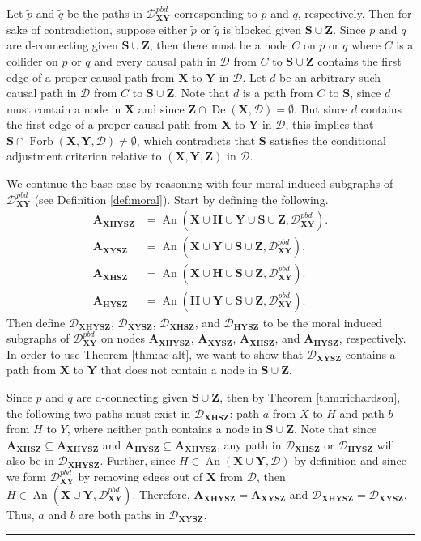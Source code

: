 \documentclass[twoside]{article}
\DeclareMathOperator{\An}{An}
\DeclareMathOperator{\De}{De}
\DeclareMathOperator{\Forb}{Forb}
\newcommand{\fb}[2][X,Y]{\Forb(\mb{#1},#2)}
\newcommand{\gpbd}[2][G]{\mathcal{#1}_{\mb{#2}}^{pbd}}
\newcommand{\mb}[1]{\mathbf{#1}}
\newcommand{\g}[1][G]{\mathcal{#1}}
\newenvironment{proofof}[1][]{\begin{trivlist}
\item[\hskip \labelsep {\bfseries Proof of #1.}]}{\hfill\BlackBox\end{trivlist}}
\newcommand{\BlackBox}{\rule{1.5ex}{1.5ex}}
\begin{document}
\begin{proofof}[Lemma \ref{lem:sound-setup1}]
    Let $\tilde{p}$ and $\tilde{q}$ be the paths in $\gpbd[D]{XY}$ corresponding to $p$ and $q$, respectively. Then for sake of contradiction, suppose either $\tilde{p}$ or $\tilde{q}$ is blocked given $\mb{S} \cup \mb{Z}$. Since $p$ and $q$ are d-connecting given $\mb{S} \cup \mb{Z}$, then there must be a node $C$ on $p$ or $q$ where $C$ is a collider on $p$ or $q$ and every causal path in $\g[D]$ from $C$ to $\mb{S} \cup \mb{Z}$ contains the first edge of a proper causal path from $\mb{X}$ to $\mb{Y}$ in $\g[D]$. Let $d$ be an arbitrary such causal path in $\g[D]$ from $C$ to $\mb{S} \cup \mb{Z}$. Note that $d$ is a path from $C$ to $\mb{S}$, since $d$ must contain a node in $\mb{X}$ and since $\mb{Z} \cap \De(\mb{X},\g[D]) = \emptyset$. But since $d$ contains the first edge of a proper causal path from $\mb{X}$ to $\mb{Y}$ in $\g[D]$, this implies that $\mb{S} \cap \fb{\g[D]} \neq \emptyset$, which contradicts that $\mb{S}$ satisfies the conditional adjustment criterion relative to $(\mb{X,Y,Z})$ in $\g[D]$.

    We continue the base case by reasoning with four moral induced subgraphs of $\gpbd[D]{XY}$ (see Definition \ref{def:moral}). Start by defining the following. 
    \begin{align}
        \mb{A}_{\mb{XHYSZ}} &= \An(\mb{X} \cup \mb{H} \cup \mb{Y} \cup \mb{S} \cup \mb{Z},\gpbd[D]{XY}). \nonumber \\
        \mb{A}_{\mb{XYSZ}} &= \An(\mb{X} \cup \mb{Y} \cup \mb{S} \cup \mb{Z},\gpbd[D]{XY}). \nonumber \\
        \mb{A}_{\mb{XHSZ}} &= \An(\mb{X} \cup \mb{H} \cup \mb{S} \cup \mb{Z},\gpbd[D]{XY}). \nonumber \\
        \mb{A}_{\mb{HYSZ}} &= \An(\mb{H} \cup \mb{Y} \cup \mb{S} \cup \mb{Z},\gpbd[D]{XY}). \nonumber 
    \end{align} 
    Then define $\g[D]_{\mb{XHYSZ}}$, $\g[D]_{\mb{XYSZ}}$, $\g[D]_{\mb{XHSZ}}$, and $\g[D]_{\mb{HYSZ}}$ to be the moral induced subgraphs of $\gpbd[D]{XY}$ on nodes $\mb{A}_{\mb{XHYSZ}}$, $\mb{A}_{\mb{XYSZ}}$, $\mb{A}_{\mb{XHSZ}}$, and $\mb{A}_{\mb{HYSZ}}$, respectively. In order to use Theorem \ref{thm:ac-alt}, we want to show that $\g[D]_{\mb{XYSZ}}$ contains a path from $\mb{X}$ to $\mb{Y}$ that does not contain a node in $\mb{S} \cup \mb{Z}$.

    Since $\tilde{p}$ and $\tilde{q}$ are d-connecting given $\mb{S} \cup \mb{Z}$, then by Theorem \ref{thm:richardson}, the following two paths must exist in $\g[D]_{\mb{XHSZ}}$: path $a$ from $X$ to $H$ and path $b$ from $H$ to $Y$, where neither path contains a node in $\mb{S} \cup \mb{Z}$. Note that since $\mb{A}_{\mb{XHSZ}} \subseteq \mb{A}_{\mb{XHYSZ}}$ and $\mb{A}_{\mb{HYSZ}} \subseteq \mb{A}_{\mb{XHYSZ}}$, any path in $\g[D]_{\mb{XHSZ}}$ or $\g[D]_{\mb{HYSZ}}$ will also be in $\g[D]_{\mb{XHYSZ}}$. Further, since $H \in \An(\mb{X} \cup \mb{Y},\g[D])$ by definition and since we form $\gpbd[D]{XY}$ by removing edges out of $\mb{X}$ from $\g[D]$, then $H \in \An(\mb{X} \cup \mb{Y},\gpbd[D]{XY})$. Therefore, $\mb{A}_{\mb{XHYSZ}} = \mb{A}_{\mb{XYSZ}}$ and $\g[D]_{\mb{XHYSZ}}=\g[D]_{\mb{XYSZ}}$. Thus, $a$ and $b$ are both paths in $\g[D]_{\mb{XYSZ}}$.


\end{proofof}
\end{document}
